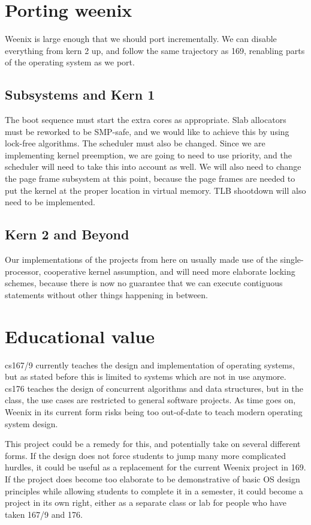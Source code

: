 \documentclass{article}
\begin{document}
\section{Porting weenix}

Weenix is large enough that we should port incrementally. We can disable everything from kern 2 up, and follow the same
trajectory as 169, renabling parts of the operating system as we port.

\subsection{Subsystems and Kern 1}

The boot sequence must start the extra cores as appropriate. Slab allocators must be reworked to be SMP-safe,
and we would like to achieve this by using lock-free algorithms. The scheduler must also be changed. Since we
are implementing kernel preemption, we are going to need to use priority, and the scheduler will need to take
this into account as well. We will also need to change the page frame subsystem at this point, because
the page frames are needed to put the kernel at the proper location in virtual memory. TLB shootdown will also
need to be implemented.

\subsection{Kern 2 and Beyond}

Our implementations of the projects from here on usually made use of the single-processor, cooperative kernel
assumption, and will need more elaborate locking schemes, because there is now no guarantee that we can
execute contiguous statements without other things happening in between.

\section{Educational value}

cs167/9 currently teaches the design and implementation of operating systems, but as stated before this is
limited to systems which are not in use anymore. cs176 teaches the design of concurrent algorithms and
data structures, but in the class, the use cases are restricted to general software projects. As time goes
on, Weenix in its current form risks being too out-of-date to teach modern operating system design.

This project could be a remedy for this, and potentially take on several different forms. If the design
does not force students to jump many more complicated hurdles, it could be useful as a replacement for the
current Weenix project in 169. If the project does become too elaborate to be demonstrative of basic OS
design principles while allowing students to complete it in a semester, it could become a project in its
own right, either as a separate class or lab for people who have taken 167/9 and 176.
\end{document}
